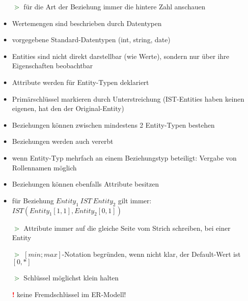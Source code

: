 \documentclass{scrartcl}
\newcommand{\hint}{{\textcolor{darkgreen}{\textbf{$\gtrdot$}}}}
\begin{document}
\begin{itemize}
	\itemsep0em
	\item[\hint] für die Art der Beziehung immer die hintere Zahl anschauen
	\item Wertemengen sind beschrieben durch Datentypen
	\item vorgegebene Standard-Datentypen (int, string, date)
	\item Entities sind nicht direkt darstellbar (wie Werte), sondern nur über ihre Eigenschaften beobachtbar
	\item Attribute werden für Entity-Typen deklariert
	\item Primärschlüssel markieren durch Unterstreichung (IST-Entities haben keinen eigenen, hat den der Original-Entity)
	\item Beziehungen können zwischen mindestens 2 Entity-Typen bestehen
	\item Beziehungen werden auch vererbt
	\item wenn Entity-Typ mehrfach an einem Beziehungstyp beteiligt: Vergabe von Rollennamen möglich
	\item Beziehungen können ebenfalls Attribute besitzen
	\item für Beziehung $Entity_{1}\ IST\ Entity_{2}$ gilt immer: $IST(Entity_{1}[1, 1], Entity_{2}[0, 1])$
	\item[\hint] Attribute immer auf die gleiche Seite vom Strich schreiben, bei einer Entity
	\item[\hint] $[min;max]$-Notation begründen, wenn nicht klar, der Default-Wert ist $[0,*]$
	\item[\hint] Schlüssel möglichst klein halten
	\item[\textbf{\textcolor{red}{!}}] keine Fremdschlüssel im ER-Modell!
\end{itemize}


\end{document}
